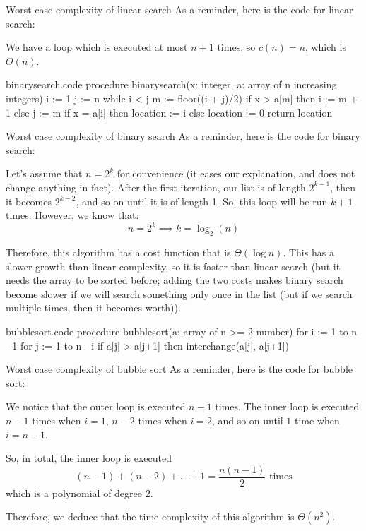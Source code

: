 \documentclass[a4paper]{article}
\begin{document}
\begin{parag}{Worst case complexity of linear search}
    As a reminder, here is the code for linear search:

    We have a loop which is executed at most $n + 1$ times, so $c\left(n\right) = n$, which is $\Theta\left(n\right)$.
\end{parag}

\begin{filecontents*}[overwrite]{binarysearch.code}
procedure binarysearch(x: integer, a: array of n increasing integers)
    i := 1
    j := n
    while i < j
        m := floor((i + j)/2)
        if x > a[m] then i := m + 1 else j := m
    if x = a[i] then location := i else location := 0
    return location
\end{filecontents*}

\begin{parag}{Worst case complexity of binary search}
    As a reminder, here is the code for binary search:

    Let's assume that $n = 2^k$ for convenience (it eases our explanation, and does not change anything in fact). After the first iteration, our list is of length $2^{k-1}$, then it becomes $2^{k-2}$, and so on until it is of length 1. So, this loop will be run $k + 1$ times. However, we know that:
    \[n = 2^{k} \implies k = \log_2\left(n\right)\]

    Therefore, this algorithm has a cost function that is $\Theta\left(\log n\right)$. This has a slower growth than linear complexity, so it is faster than linear search (but it needs the array to be sorted before; adding the two costs makes binary search become slower if we will search something only once in the list (but if we search multiple times, then it becomes worth)).
\end{parag}

\begin{filecontents*}[overwrite]{bubblesort.code}
procedure bubblesort(a: array of n >= 2 number)
    for i := 1 to n - 1
        for j := 1 to n - i
            if a[j] > a[j+1] then interchange(a[j], a[j+1])
\end{filecontents*}

\begin{parag}{Worst case complexity of bubble sort}
    As a reminder, here is the code for bubble sort:

    We notice that the outer loop is executed $n - 1$ times. The inner loop is executed $n - 1$ times when $i = 1$, $n - 2$ times when $i = 2$, and so on until $1$ time when $i = n - 1$.

    So, in total, the inner loop is executed
    \[\left(n-1\right) + \left(n-2\right) + \ldots + 1 = \frac{n\left(n-1\right)}{2} \text{ times}\]
    which is a polynomial of degree 2.

    Therefore, we deduce that the time complexity of this algorithm is $\Theta\left(n^2\right)$.
\end{parag}
\end{document}

